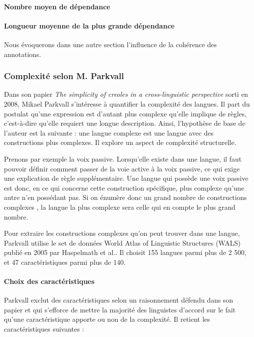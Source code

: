 \documentclass[a4paper, twoside]{article}
\begin{document}
    \paragraph{Nombre moyen de dépendance}

    \paragraph{Longueur moyenne de la plus grande dépendance}

    Nous évoquerons dans une autre section l'influence de la cohérence des annotations.

    \subsubsection{Complexité selon M. Parkvall}

    Dans son papier \textit{The simplicity of creoles in a cross-linguistic perspective} \cite{parkvall} sorti en 2008, Mikael Parkvall s’intéresse à quantifier la complexité des langues. Il part du postulat qu’une expression est d’autant plus complexe qu’elle implique de règles, c’est-à-dire qu’elle requiert une longue description. Ainsi, l'hypothèse de base de l’auteur est la suivante : une langue complexe est une langue avec des constructions plus complexes. Il explore un aspect de complexité structurelle.

    Prenons par exemple la voix passive. Lorsqu’elle existe dans une langue, il faut pouvoir définir comment passer de la voie active à la voix passive, ce qui exige une explication de règle supplémentaire. Une langue qui possède une voix passive est donc, en ce qui concerne cette construction spécifique, plus complexe qu’une autre n’en possédant pas. Si on énumère donc un grand nombre de \og constructions complexes \fg{}, la langue la plus complexe sera celle qui en compte le plus grand nombre.

    Pour extraire les \og constructions complexes \fg{} qu’on peut trouver dans une langue, Parkvall utilise le set de données World Atlas of Linguistic Structures (WALS) publié en 2005 par Haspelmath et al.. Il choisit 155 langues parmi plus de 2 500, et 47 caractéristiques parmi plus de 140.

    \paragraph{Choix des caractéristiques}

    Parkvall exclut des caractéristiques selon un raisonnement défendu dans son papier et qui s’efforce de mettre la majorité des linguistes d’accord sur le fait qu’une caractéristique apporte ou non de la complexité. Il retient les caractéristiques suivantes : \par
\end{document}
